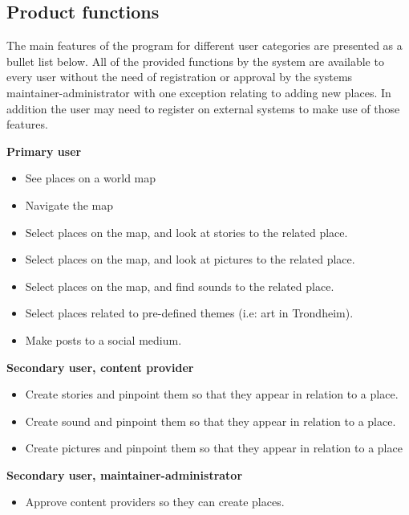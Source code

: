 \noindent

\subsection{Product functions}

The main features of the program for different user categories are presented as a bullet list below. All of the provided functions by the system are available to every user without the need of registration or approval by the systems maintainer-administrator with one exception relating to adding new places. In addition the user may need to register on external systems to make use of those features.

\noindent


\begin{description}
\item [\textbf{Primary user}]
\end{description}
\begin{itemize}
\item See places on a world map
\item Navigate the map
\item Select places on the map, and look at stories to the related place. 
\item Select places on the map, and look at pictures to the related place.
\item Select places on the map, and find sounds to the related place.
\item Select places related to pre-defined themes (i.e: art in Trondheim).
\item Make posts to a social medium. 
\end{itemize}
\vspace{0.5cm}
\begin{description}
\item [\textbf{Secondary user, content provider}]
\end{description}
\begin{itemize}
\item Create stories and pinpoint them so that they appear in relation to a place.
\item Create sound and pinpoint them so that they appear in relation to a place.
\item Create pictures and pinpoint them so that they appear in relation to a place
\end{itemize}
\vspace{0.5cm}
\begin{description}
\item [\textbf{Secondary user, maintainer-administrator}]
\end{description}
\begin{itemize}
\item Approve content providers so they can create places.
\end{itemize}

